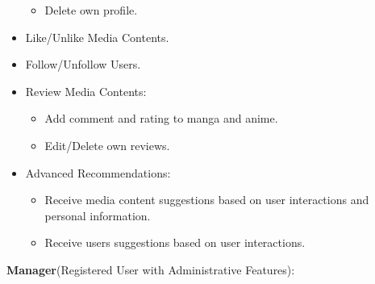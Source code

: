 \begin{itemize}
\begin{itemize}
        \item Delete own profile.
    \end{itemize}
    \item Like/Unlike Media Contents.
    \item Follow/Unfollow Users.
    \item Review Media Contents:
    \begin{itemize}
        \item Add comment and rating to manga and anime.
        \item Edit/Delete own reviews.
    \end{itemize}
    \item Advanced Recommendations:
    \begin{itemize}
        \item Receive media content suggestions based on user interactions and personal information.
        \item Receive users suggestions based on user interactions.
    \end{itemize}
\end{itemize}

\textbf{Manager}(Registered User with Administrative Features):

